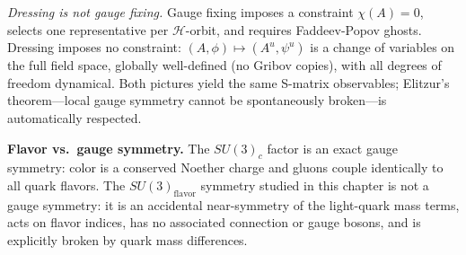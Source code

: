 {\smallskip
\textit{Dressing is not gauge fixing.}\enspace
Gauge fixing imposes a constraint $\chi(A)=0$, selects one representative per
$\mathcal{H}$-orbit, and requires Faddeev-Popov ghosts.
Dressing imposes no constraint: $(A,\phi)\mapsto(A^u,\psi^u)$ is a change of
variables on the full field space, globally well-defined (no Gribov copies), with
all degrees of freedom dynamical.
Both pictures yield the same S-matrix observables; Elitzur's theorem---local gauge
symmetry cannot be spontaneously broken---is automatically respected.

\medskip
\textbf{Flavor vs.\ gauge symmetry.}\quad
The $SU(3)_c$ factor is an exact gauge symmetry: color is a conserved Noether charge
and gluons couple identically to all quark flavors.
The $SU(3)_{\mathrm{flavor}}$ symmetry studied in this chapter is not a gauge symmetry:
it is an accidental near-symmetry of the light-quark mass terms, acts on flavor indices,
has no associated connection or gauge bosons, and is explicitly broken by quark mass
differences.
}
